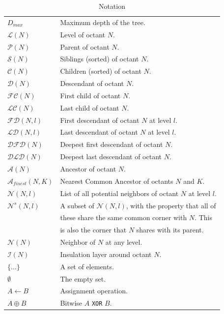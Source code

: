 \begin{table}
  \centering
  \caption{Notation}
  \begin{tabular}{|ll|} \hline 
    $D_{max}$ & Maximum depth of the tree.\\
    $\mathcal{L}(N)$ & Level of octant $N$.\\		
    $\mathcal{P}(N)$ & Parent of octant $N$.\\
    $\mathcal{S}(N)$ & Siblings (sorted) of octant $N$.\\
    $\mathcal{C}(N)$ & Children (sorted) of octant $N$.\\    								 
    $\mathcal{D}(N)$ & Descendant of octant $N$.\\
    $\mathcal{FC}(N)$ & First child of octant $N$.\\ 				
    $\mathcal{LC}(N)$ & Last child of octant $N$.\\ 				  
    $\mathcal{FD}\left(N,l\right)$ & First descendant of octant $N$ at level $l$.\\
    $\mathcal{LD}\left(N,l\right)$ & Last descendant of octant $N$ at level $l$.\\
    $\mathcal{DFD}(N)$ & Deepest first descendant of octant $N$.\\
    $\mathcal{DLD}(N)$ & Deepest last descendant of octant $N$.\\    
    $\mathcal{A}(N)$ & Ancestor of octant $N$.\\		   
    $\mathcal{A}_{finest}\left(N,K\right)$ & Nearest Common Ancestor of octants $N$ and $K$.\\
    $\mathcal{N}\left(N,l\right)$ & List of all potential neighbors of octant $N$ at level $l$.\\
    $\mathcal{N}^{s}\left(N,l\right)$ & A subset of $\mathcal{N}(N,l)$, with the property that all of\\
    & these share the same common corner with $N$. This \\
    & is also the corner that $N$ shares with its parent.\\
    $\mathcal{N}\left(N\right)$ & Neighbor of $N$ at any level.\\ 
    $\mathcal{I}(N)$ & Insulation layer around octant $N$.\\
    $\{\ldots\}$ & A set of elements.\\           
    $\emptyset$ & The empty set.\\
    $A \leftarrow B$ & Assignment operation.\\
    $A \oplus B$ & Bitwise $A$ {\tt{XOR}} $B$.\\

\end{tabular}
\end{table}
